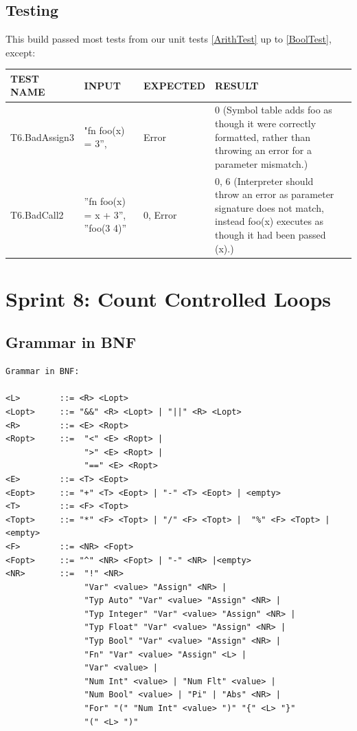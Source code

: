 \documentclass[a4paper, oneside, 11pt]{report}
\begin{document}
    \subsection{Testing}

    This build passed most tests from our unit tests \ref{ArithTest} up to \ref{BoolTest}, except:
    \begin{center}
        \begin{tabular}{|p{1.5in}|p{1.5in}|p{1in}|p{1.6in}|p{2.4in}|}
            \hline
            TEST NAME & INPUT & EXPECTED & RESULT \\
            \hline
            T6.BadAssign3 & "fn foo(x) = 3”, & Error & 0 (Symbol table adds foo as though it were correctly formatted, rather than throwing an error for a parameter mismatch.) \\
            \hline
            T6.BadCall2 & ”fn foo(x) = x + 3”, ”foo(3 4)” & 0, Error & 0, 6 (Interpreter should throw an error as parameter signature does not match, instead foo(x) executes as though it had been passed (x).) \\
            \hline
        \end{tabular}
    \end{center}
    \clearpage
    \section{Sprint 8: Count Controlled Loops}
    \subsection{Grammar in BNF}
    \begin{verbatim}
Grammar in BNF:

<L>        ::= <R> <Lopt>
<Lopt>     ::= "&&" <R> <Lopt> | "||" <R> <Lopt>
<R>        ::= <E> <Ropt>
<Ropt>     ::=  "<" <E> <Ropt> |
                ">" <E> <Ropt> |
                "==" <E> <Ropt>
<E>        ::= <T> <Eopt>
<Eopt>     ::= "+" <T> <Eopt> | "-" <T> <Eopt> | <empty>
<T>        ::= <F> <Topt>
<Topt>     ::= "*" <F> <Topt> | "/" <F> <Topt> |  "%" <F> <Topt> |<empty>
<F>        ::= <NR> <Fopt>
<Fopt>     ::= "^" <NR> <Fopt> | "-" <NR> |<empty>
<NR>       ::=  "!" <NR>
                "Var" <value> "Assign" <NR> |
                "Typ Auto" "Var" <value> "Assign" <NR> |
                "Typ Integer" "Var" <value> "Assign" <NR> |
                "Typ Float" "Var" <value> "Assign" <NR> |
                "Typ Bool" "Var" <value> "Assign" <NR> |
                "Fn" "Var" <value> "Assign" <L> |
                "Var" <value> |
                "Num Int" <value> | "Num Flt" <value> |
                "Num Bool" <value> | "Pi" | "Abs" <NR> |
                "For" "(" "Num Int" <value> ")" "{" <L> "}"
                "(" <L> ")"
    \end{verbatim}
\end{document}
